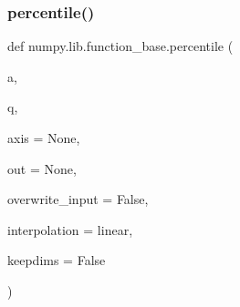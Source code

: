 \subsubsection{\texorpdfstring{percentile()}{percentile()}}
{\footnotesize\ttfamily def numpy.\+lib.\+function\+\_\+base.\+percentile (\begin{DoxyParamCaption}\item[{}]{a,  }\item[{}]{q,  }\item[{}]{axis = {\ttfamily None},  }\item[{}]{out = {\ttfamily None},  }\item[{}]{overwrite\+\_\+input = {\ttfamily False},  }\item[{}]{interpolation = {\ttfamily \textquotesingle{}linear\textquotesingle{}},  }\item[{}]{keepdims = {\ttfamily False} }\end{DoxyParamCaption})}

